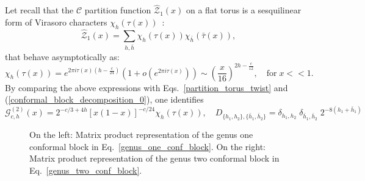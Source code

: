 \documentclass[a4paper,11pt]{article}
\begin{document}
\noindent Let recall that the $\mathcal{C}$ partition function $\mathcal{\hat{Z}}_1(x)$ on a flat torus is a sesquilinear form of Virasoro characters $\chi_{h}(\tau(x))$~\cite{Cappelli, Cappelli2}:
\begin{equation}
\mathcal{\hat{Z}}_1(x) = \sum_{h,\bar{h}} \chi_{h}(\tau(x)) \chi_{\bar{h}}(\bar{\tau}(x)),
\end{equation}
that behave asymptotically as:
\begin{equation}
\chi_{h}(\tau(x)) = e^{2\pi i \tau(x)\left(h-\frac{c}{24}\right)}\left(1+ o\left(e^{2\pi i \tau(x)}\right)\right) \sim \left(\frac{x}{16}\right)^{ 2 h-\frac{c}{12}}, \quad \text{for}\; x<<1.
\end{equation}
 By comparing the above expressions with Eqs.~\eqref{partition_torus_twist}  and (\ref{conformal_block_decomposition_0}), one identifies 
\begin{equation}\label{character_conf_block}
\mathcal{G}_{c,h}^{(2)}(x)=2^{-c/3+4 h}[x(1-x)]^{-c/24}\chi_{h}(\tau(x)),\quad  D_{\{ h_1, h_2 \}, \{ \bar{h}_1,\bar{h}_2\} } =\delta_{h_1,h_2}\;\delta_{\bar{h}_1,\bar{h}_2} \;2^{-8 (h_1+\bar{h}_1)}
\end{equation}



\begin{figure}[t]
\centering
\caption{On the left: Matrix product representation of the genus one conformal block in Eq.~\eqref{genus_one_conf_block}. On the right: Matrix product representation of the genus two conformal block in Eq.~\eqref{genus_two_conf_block}.}
\label{fig-g1}
\end{figure}
\end{document}
